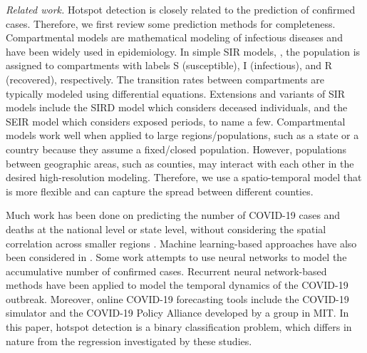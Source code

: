 \documentclass[journal]{IEEEtran}
\begin{document}
\vspace{.1in}
\noindent\emph{Related work.}
Hotspot detection is closely related to the prediction of confirmed cases. Therefore, we first review some prediction methods for completeness. Compartmental models are mathematical modeling of infectious diseases and have been widely used in epidemiology. In simple SIR models, \cite{Harko2014}, the population is assigned to compartments with labels S (susceptible), I (infectious), and R (recovered), respectively. The transition rates between compartments are typically modeled using differential equations. 
Extensions and variants of SIR models include the SIRD model \cite{fernandez2020estimating,caccavo2020chinese} which considers deceased individuals, and the SEIR model \cite{Hethcote2000,yang2020modified,hou2020effectiveness} which considers exposed periods, to name a few. Compartmental models work well when applied to large regions/populations, such as a state or a country because they assume a fixed/closed population. 
However, populations between geographic areas, such as counties, may interact with each other in the desired high-resolution modeling. Therefore, we use a spatio-temporal model that is more flexible and can capture the spread between different counties. 

Much work has been done on predicting the number of COVID-19 cases and deaths at the national level or state level, without considering the spatial correlation across smaller regions \cite{LANL, UTaustin, MOBS, IHME, zhu2020high,bertozzi2020challenges,ghosh2020covid}. 
Machine learning-based approaches have also been considered in \cite{alazab2020covid}.
Some work \cite{tamang2020forecasting} attempts to use neural networks to model the accumulative number of confirmed cases.
Recurrent neural network-based methods \cite{hawas2020generated, zhao2020well} have been applied to model the temporal dynamics of the COVID-19 outbreak. Moreover, online COVID-19 forecasting tools include the COVID-19 simulator \cite{chhatwal2020covid} and the COVID-19 Policy Alliance developed by a group in MIT. In this paper, hotspot detection is a binary classification problem, which differs in nature from the regression investigated by these studies. 
\end{document}
